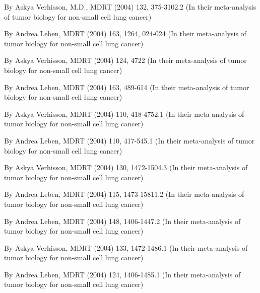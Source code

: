 \documentclass{article}
\begin{document}
By Askya Verhisson, M.D., MDRT (2004) 132, 375-3102.2 (In their meta-analysis of tumor biology for non-small cell lung cancer)

By Andrea Leben, MDRT (2004) 163, 1264, 024-024 (In their meta-analysis of tumor biology for non-small cell lung cancer)

By Askya Verhisson, MDRT (2004) 124, 4722 (In their meta-analysis of tumor biology for non-small cell lung cancer)

By Andrea Leben, MDRT (2004) 163, 489-614 (In their meta-analysis of tumor biology for non-small cell lung cancer)

By Askya Verhisson, MDRT (2004) 110, 418-4752.1 (In their meta-analysis of tumor biology for non-small cell lung cancer)

By Andrea Leben, MDRT (2004) 110, 417-545.1 (In their meta-analysis of tumor biology for non-small cell lung cancer)

By Askya Verhisson, MDRT (2004) 130, 1472-1504.3 (In their meta-analysis of tumor biology for non-small cell lung cancer)

By Andrea Leben, MDRT (2004) 115, 1473-15811.2 (In their meta-analysis of tumor biology for non-small cell lung cancer)

By Andrea Leben, MDRT (2004) 148, 1406-1447.2 (In their meta-analysis of tumor biology for non-small cell lung cancer)

By Askya Verhisson, MDRT (2004) 133, 1472-1486.1 (In their meta-analysis of tumor biology for non-small cell lung cancer)

By Andrea Leben, MDRT (2004) 124, 1406-1485.1 (In their meta-analysis of tumor biology for non-small cell lung cancer)
\end{document}
